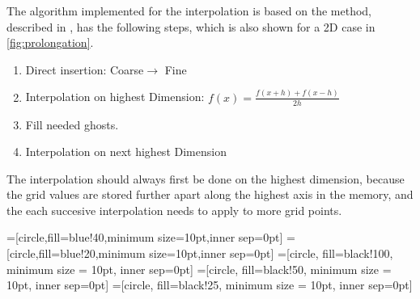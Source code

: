 	The algorithm implemented for the interpolation is based on the method, described in
	\citet{press_numerical_1988}, has the following steps, which is also shown for a 2D case in \cref{fig:prolongation}.

 	\begin{enumerate}
		\item Direct insertion: Coarse$\rightarrow$ Fine
		\item Interpolation on highest Dimension: \(f(x) = \frac{f(x+h) + f(x-h)}{2h}\)
		\item Fill needed ghosts.
		\item Interpolation on next highest Dimension
	\end{enumerate}

	The interpolation should always first be done on the highest dimension, because the grid values are stored further
	apart along the highest axis in the memory, and the each succesive interpolation needs to apply to more grid points.

	=[circle,fill=blue!40,minimum size=10pt,inner sep=0pt]
	=[circle,fill=blue!20,minimum size=10pt,inner sep=0pt]
	=[circle, fill=black!100, minimum size = 10pt, inner sep=0pt]
	=[circle, fill=black!50, minimum size = 10pt, inner sep=0pt]
	=[circle, fill=black!25, minimum size = 10pt, inner sep=0pt]


